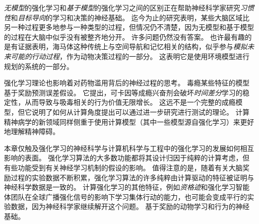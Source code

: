 \textit{无模型}的强化学习和\textit{基于模型}的强化学习之间的区别正在帮助神经科学家研究\textit{习惯性}和\textit{目标导向}的学习和决策的神经基础。
迄今为止的研究表明，某些大脑区域比另一种过程更多地参与一种类型的过程，但情况仍不清楚，因为无模型和基于模型的过程在大脑中似乎没有被整齐地分开。
许多问题仍然没有答案。
也许最有趣的是有证据表明，海马体这种传统上与空间导航和记忆相关的结构，似乎参与\textit{模拟未来可能的行动过程}，作为动物决策过程的一部分。
这表明它是使用环境模型进行规划的系统的一部分。


强化学习理论也影响着对药物滥用背后的神经过程的思考。
毒瘾某些特征的模型基于奖励预测误差假设。
它提出，可卡因等成瘾兴奋剂会破坏\textit{时间差分}学习的稳定性，从而导致与吸毒相关的行为价值无限增长。
这远不是一个完整的成瘾模型，但它说明了如何从计算角度提出可以通过进一步研究进行测试的理论。
计算精神病学的新领域同样侧重于使用计算模型（其中一些模型源自强化学习）来更好地理解精神障碍。



本章仅触及强化学习的神经科学与计算机科学与工程中的强化学习的发展如何相互影响的表面。
强化学习算法的大多数功能都将其设计归因于纯粹的计算考虑，但有些功能受到有关神经学习机制的假设的影响。
值得注意的是，随着有关大脑奖励过程的实验数据不断积累，强化学习算法的许多纯粹由计算驱动的特征被证明与神经科学数据是一致的。
计算强化学习的其他特征，例如\textit{资格迹}和强化学习智能体团队在全球广播强化信号的影响下学习集体行动的能力，也可能会变成平行的实验数据，因为神经科学家继续解开这个问题。
基于奖励的动物学习和行为的神经基础。








